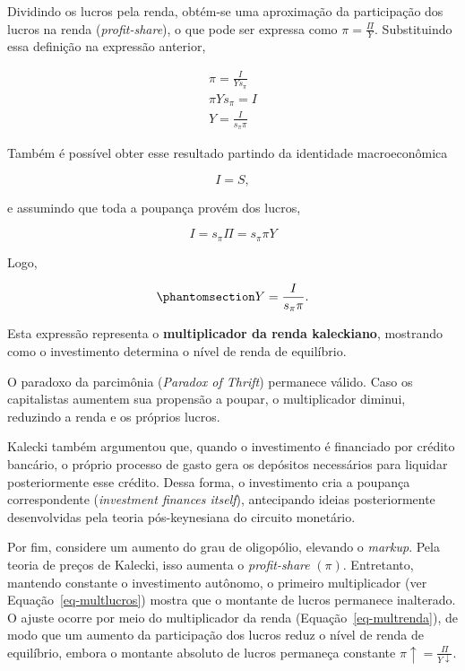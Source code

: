 \documentclass[
  brazilian,
  letterpaper,
  DIV=11,
  numbers=noendperiod]{scrreprt}
\begin{document}
Dividindo os lucros pela renda, obtém-se uma aproximação da participação
dos lucros na renda (\emph{profit-share}), o que pode ser expressa como
\(\pi=\frac{\Pi}{Y}\). Substituindo essa definição na expressão
anterior,

\[\begin{aligned}
\pi=\frac{I}{Ys_\pi} \\
\pi Y s_\pi = I\\
Y=\frac{I}{s_\pi \pi}
\end{aligned}\]

Também é possível obter esse resultado partindo da identidade
macroeconômica

\[I=S,\]

e assumindo que toda a poupança provém dos lucros,

\[I=s_\pi\Pi=s_\pi\pi Y\]

Logo,

\begin{equation}\protect\phantomsection\label{eq-multrenda}{Y=\frac{I}{s_\pi\pi}.}\end{equation}

Esta expressão representa o \textbf{multiplicador da renda kaleckiano},
mostrando como o investimento determina o nível de renda de equilíbrio.

O paradoxo da parcimônia (\emph{Paradox of Thrift}) permanece válido.
Caso os capitalistas aumentem sua propensão a poupar, o multiplicador
diminui, reduzindo a renda e os próprios lucros.

Kalecki também argumentou que, quando o investimento é financiado por
crédito bancário, o próprio processo de gasto gera os depósitos
necessários para liquidar posteriormente esse crédito. Dessa forma, o
investimento cria a poupança correspondente (\emph{investment finances
itself}), antecipando ideias posteriormente desenvolvidas pela teoria
pós-keynesiana do circuito monetário.

Por fim, considere um aumento do grau de oligopólio, elevando o
\emph{markup}. Pela teoria de preços de Kalecki, isso aumenta o
\emph{profit-share} \((\pi)\). Entretanto, mantendo constante o
investimento autônomo, o primeiro multiplicador (ver
Equação~\ref{eq-multlucros}) mostra que o montante de lucros permanece
inalterado. O ajuste ocorre por meio do multiplicador da renda
(Equação~\ref{eq-multrenda}), de modo que um aumento da participação dos
lucros reduz o nível de renda de equilíbrio, embora o montante absoluto
de lucros permaneça constante \(\pi\uparrow=\frac{\Pi}{Y\downarrow}\).
\end{document}
